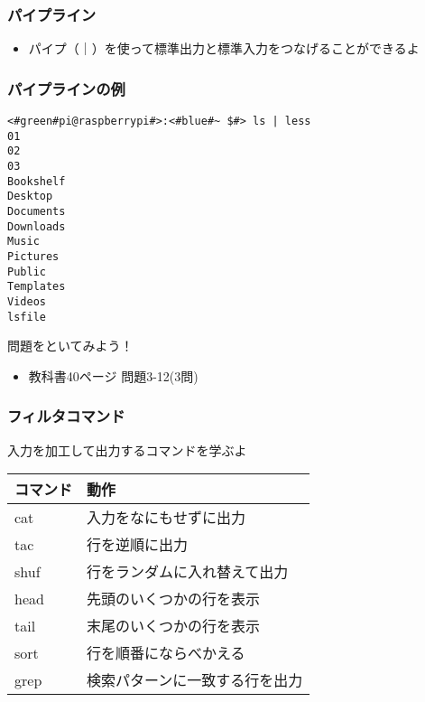 \begin{frame}
    \frametitle{パイプライン}
    \vspace{2em}
    \begin{itemize}
        \item パイプ（｜）を使って標準出力と標準入力をつなげることができるよ
    \end{itemize}
    \begin{figure}
        \centering
        
    \end{figure}
\end{frame}

\begin{frame}[fragile]
    \frametitle{パイプラインの例}
    \begin{lstlisting}[title=lsコマンドの出力をパイプでlessコマンドに渡す, label=redirectCat]
<#green#pi@raspberrypi#>:<#blue#~ $#> ls | less
01
02
03
Bookshelf
Desktop
Documents
Downloads
Music
Pictures
Public
Templates
Videos
lsfile
    \end{lstlisting}
\end{frame}

\begin{frame}
    \begin{exampleblock}{問題をといてみよう！}
        \begin{itemize}
            \item 教科書40ページ 問題3-12(3問)
        \end{itemize}
    \end{exampleblock} 
\end{frame}

\begin{frame}
    \frametitle{フィルタコマンド}
    入力を加工して出力するコマンドを学ぶよ\\
    \vspace{\zh}
    \begin{tabular}{ll}
        コマンド & 動作                               \\ \hline
        cat      & 入力をなにもせずに出力         \\
        tac      & 行を逆順に出力                 \\
        shuf     & 行をランダムに入れ替えて出力   \\
        head     & 先頭のいくつかの行を表示       \\
        tail     & 末尾のいくつかの行を表示       \\
        sort     & 行を順番にならべかえる         \\
        grep     & 検索パターンに一致する行を出力 \\ \hline
    \end{tabular}
\end{frame}

